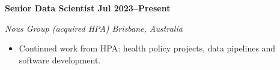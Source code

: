 \textbf{Senior Data Scientist \hfill Jul 2023--Present}\par
\textit{Nous Group (acquired HPA) \hfill Brisbane, Australia}\par
\begin{itemize}
	\item Continued work from HPA: health policy projects, data pipelines and software development.
\end{itemize}\par